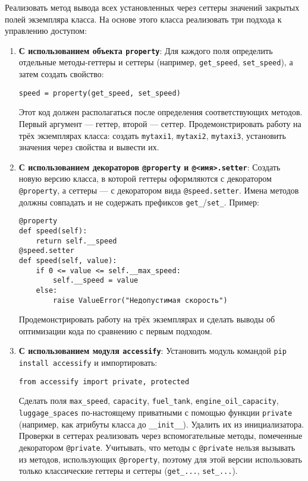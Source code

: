 \begin{enumerate}
\begin{itemize}
\end{itemize}
Реализовать метод вывода всех установленных через сеттеры значений закрытых полей экземпляра класса.
На основе этого класса реализовать три подхода к управлению доступом:
\begin{enumerate}
    \item \textbf{С использованием объекта \texttt{property}}:  
    Для каждого поля определить отдельные методы-геттеры и сеттеры (например, \texttt{get\_speed}, \texttt{set\_speed}), а затем создать свойство:  
    \begin{verbatim}
speed = property(get_speed, set_speed)
    \end{verbatim}  
    Этот код должен располагаться после определения соответствующих методов. Первый аргумент — геттер, второй — сеттер.  
    Продемонстрировать работу на трёх экземплярах класса: создать \texttt{mytaxi1}, \texttt{mytaxi2}, \texttt{mytaxi3}, установить значения через свойства и вывести их.
    \item \textbf{С использованием декораторов \texttt{@property} и \texttt{@<имя>.setter}}:  
    Создать новую версию класса, в которой геттеры оформляются с декоратором \texttt{@property}, а сеттеры — с декоратором вида \texttt{@speed.setter}. Имена методов должны совпадать и не содержать префиксов \texttt{get\_}/\texttt{set\_}.  
    Пример:  
    \begin{verbatim}
@property
def speed(self):
    return self.__speed
@speed.setter
def speed(self, value):
    if 0 <= value <= self.__max_speed:
        self.__speed = value
    else:
        raise ValueError("Недопустимая скорость")
    \end{verbatim}  
    Продемонстрировать работу на трёх экземплярах и сделать выводы об оптимизации кода по сравнению с первым подходом.
    \item \textbf{С использованием модуля \texttt{accessify}}:  
    Установить модуль командой \texttt{pip install accessify} и импортировать:  
    \begin{verbatim}
from accessify import private, protected
    \end{verbatim}  
    Сделать поля \texttt{max\_speed}, \texttt{capacity}, \texttt{fuel\_tank}, \texttt{engine\_oil\_capacity}, \texttt{luggage\_spaces} по-настоящему приватными с помощью функции \texttt{private} (например, как атрибуты класса до \texttt{\_\_init\_\_}). Удалить их из инициализатора.  
    Проверки в сеттерах реализовать через вспомогательные методы, помеченные декоратором \texttt{@private}.  
    Учитывать, что методы с \texttt{@private} нельзя вызывать из методов, использующих \texttt{@property}, поэтому для этой версии использовать только классические геттеры и сеттеры (\texttt{get\_...}, \texttt{set\_...}).  

\end{enumerate}
\end{enumerate}
